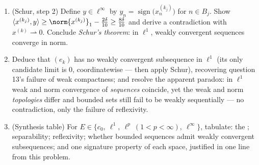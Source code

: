 \begin{problem}[{Weekend problem --- $(\ell^p)' = \ell^q$,
reflexivity, and the strangeness of $\ell^\infty$}]
\begin{enumerate}[resume]
        $0 = N_0 < N_1 < N_2 < \cdots$ such that the mass of
        $x^{(k_j)}$ concentrates on the block $B_j =
        \intoc{N_{j-1}}{N_j}$:
        \[
        \sum_{n \in B_j}\bigl|x^{(k_j)}_n\bigr| \geq
        \norm{x^{(k_j)}}_1 - \frac\delta{10} .
        \]
  \item (Schur, step 2) Define $y \in \ell^\infty$ by $y_n =
        \operatorname{sign}\bigl(x^{(k_j)}_n\bigr)$ for $n \in
        B_j$. Show $\langle x^{(k_j)}, y\rangle \geq
        \norm{x^{(k_j)}}_1 - \frac{2\delta}{10} \geq
        \frac{8\delta}{10}$ and derive a contradiction with
        $x^{(k)} \rightharpoonup 0$. Conclude \emph{Schur's
        theorem}: in $\ell^1$, weakly convergent sequences
        converge in norm.
  \item Deduce that $(e_k)$ has no weakly convergent
        subsequence in $\ell^1$ (its only candidate limit is
        $0$, coordinatewise --- then apply Schur), recovering
        question 13's failure of weak compactness; and resolve
        the apparent paradox: in $\ell^1$ weak and norm
        convergence of \emph{sequences} coincide, yet the
        weak and norm \emph{topologies} differ and bounded
        sets still fail to be weakly sequentially  ---
        no contradiction, only the failure of reflexivity.
  \item (Synthesis table) For $E \in \{c_0,\ \ell^1,\ \ell^p\
        (1{<}p{<}\infty),\ \ell^\infty\}$, tabulate: the ;
        separability; reflexivity; whether bounded sequences
        admit weakly convergent subsequences; and one
        signature property of each space, justified in one
        line from this problem.
\end{enumerate}


\end{problem}

